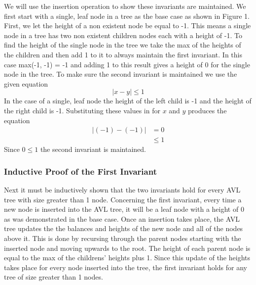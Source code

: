 \documentclass[12pt]{article}
\begin{document}
We will use the insertion operation to show these invariants are maintained. 
We first start with a single, leaf node in a tree as the base case as shown in
Figure 1.  First, we let the height of a non existent node be equal to -1.
This means a single node in a tree has two non existent children nodes each
with a height of -1.  To find the height of the single node in the tree we take the max of the
heights of the children and then add 1 to it to always maintain the first
invariant.  In this case max(-1, -1) = -1 and adding 1 to this result gives a
height of 0 for the single node in the tree.  To make sure the second invariant
is maintained we use the given equation
$$
|x-y| \le 1
$$
In the case of a single, leaf node the height of the left child is
-1 and the height of the right child is -1.  Substituting these values in for
$x$ and $y$ produces the equation
\begin{align*}
|(-1)-(-1)| &= 0\\
&\le 1
\end{align*}
Since $0 \le 1$ the second invariant is maintained.
\subsubsection*{Inductive Proof of the First Invariant}
Next it must be inductively shown that the two invariants hold for every AVL
tree with size greater than 1 node.  Concerning the first invariant, every time
a new node is inserted into the AVL tree, it will be a leaf node with a height
of 0 as was demonstrated in the base case.  Once an insertion takes place, the
AVL tree updates the the balances and heights of the new node and all of the
nodes above it.  This is done by recursing through 
the parent nodes starting with the inserted node and moving upwards to the
root.  The height of each parent node is equal to the max of
the childrens' heights plus 1.  Since this update of the heights takes place for
every node inserted into the tree, the first invariant holds for any tree of
size greater than 1 nodes.\\
\end{document}
